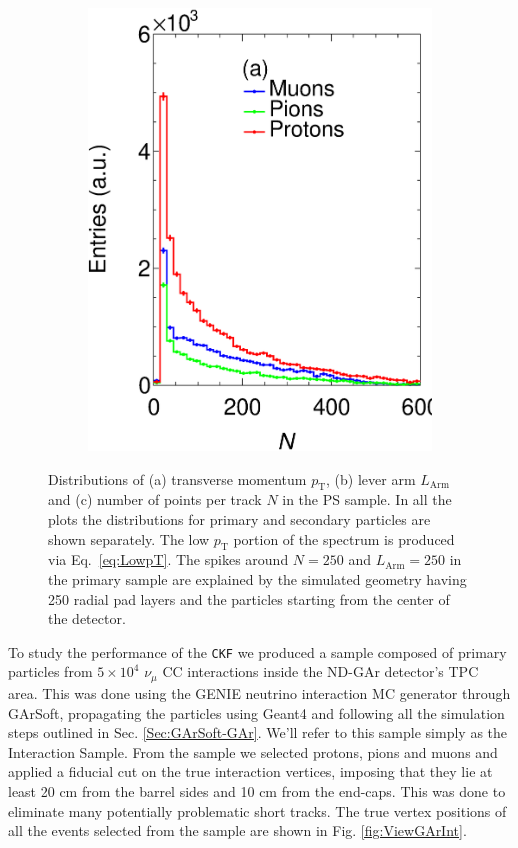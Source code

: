 \begin{figure}[t]
\begin{subfigure}[b]{0.32\textwidth}
         \includegraphics[width=\textwidth]{figures/ch5-KF_NDGAr/FullSample/Int/Props/NTall.eps}
         \caption{}
         \label{fig:NTPC_Int}
     \end{subfigure}
        \caption{Distributions of (a) transverse momentum $p_{\textrm{T}}$,  (b) lever arm $L_{\textrm{Arm}}$ and (c) number of points per track $N$ in the PS sample. In all the plots the distributions for primary and secondary particles are shown separately. The low $p_{\textrm{T}}$ portion of the spectrum is produced via Eq.~\ref{eq:LowpT}. The spikes around $N=250$ and $L_{\textrm{Arm}}=250$ in the primary sample are explained by the simulated geometry having 250 radial pad layers and the particles starting from the center of the detector. } \label{fig:TPCProperties_Int}
\end{figure}

To study the performance of the \texttt{CKF} we produced a sample composed of primary particles from $5\times10^4$  $\nu_\mu$ CC interactions inside the ND-GAr detector's TPC area. This was done using the GENIE neutrino interaction MC generator through GArSoft, propagating the particles using Geant4 and following all the simulation steps outlined in Sec. \ref{Sec:GArSoft-GAr}. We'll refer to this sample simply as the Interaction Sample. From the sample we selected protons, pions and muons and applied a fiducial cut on the true interaction vertices, imposing that they lie at least 20 cm from the barrel sides and 10 cm from the end-caps. This was done to eliminate many potentially problematic short tracks. The true vertex positions of all the events selected from the sample are shown in Fig. \ref{fig:ViewGArInt}.

